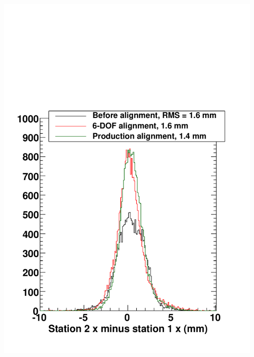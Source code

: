 \documentclass[compress]{beamer}
\begin{document}
\begin{frame}
\begin{columns}
\includegraphics[width=\linewidth]{residuals_xdifffid1cut_12.pdf}

\end{columns}
\end{frame}
\end{document}
